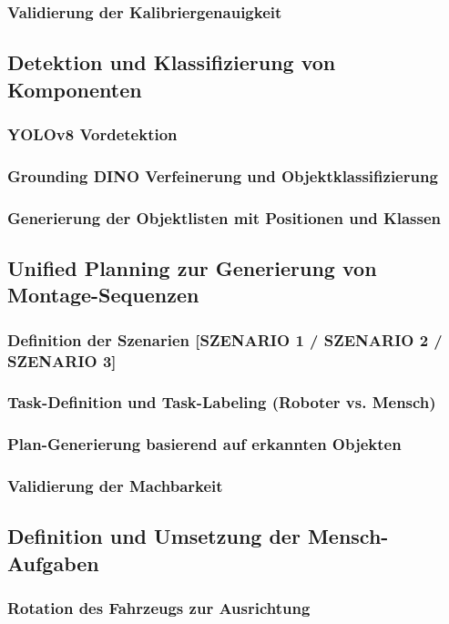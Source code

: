 \documentclass[12pt]{article}
\begin{document}
    \subsubsection{Validierung der Kalibriergenauigkeit}

\subsection{Detektion und Klassifizierung von Komponenten}
    \subsubsection{YOLOv8 Vordetektion}
    \subsubsection{Grounding DINO Verfeinerung und Objektklassifizierung}
    \subsubsection{Generierung der Objektlisten mit Positionen und Klassen}

\subsection{Unified Planning zur Generierung von Montage-Sequenzen}
    \subsubsection{Definition der Szenarien [SZENARIO 1 / SZENARIO 2 / SZENARIO 3]}
    \subsubsection{Task-Definition und Task-Labeling (Roboter vs. Mensch)}
    \subsubsection{Plan-Generierung basierend auf erkannten Objekten}
    \subsubsection{Validierung der Machbarkeit}

\subsection{Definition und Umsetzung der Mensch-Aufgaben}
    \subsubsection{Rotation des Fahrzeugs zur Ausrichtung}
\end{document}
